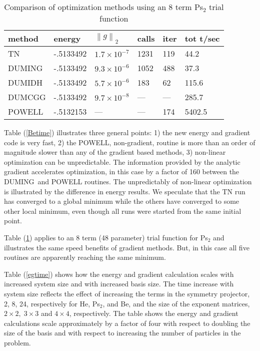\documentclass[12pt,thmsa]{article}
\begin{document}
\begin{table}[p] \centering%
\begin{tabular}{llllll}
\hline\hline
method & energy & $\left\| g\right\| _2$ & calls & iter & tot t/sec \\ \hline
TN & -.5133492 & $1.7\times 10^{-7}$ & 1231 & 119 & 44.2 \\ 
DUMING & -.5133492 & $9.3\times 10^{-6}$ & 1052 & 488 & 37.3 \\ 
DUMIDH & -.5133492 & $5.7\times 10^{-6}$ & 183 & 62 & 115.6 \\ 
DUMCGG & -.5133492 & $9.7\times 10^{-8}$ & --- & --- & 285.7 \\ 
POWELL & -.5132153 & --- & --- & 174 & 5402.5 \\ \hline\hline
\end{tabular}
\caption{Comparison of optimization methods using an 8 term Ps$_{2}$ trial
function\label{Pstime}}%
\end{table}%

Table (\ref{Betime}) illustrates three general points: 1) the new energy and
gradient code is very fast, 2) the POWELL, non-gradient, routine is more
than an order of magnitude slower than any of the gradient based methods, 3)
non-linear optimization can be unpredictable. The information provided by
the analytic gradient accelerates optimization, in this case by a factor of
160 between the DUMING\ and POWELL routines. The unpredictably of non-linear
optimization is illustrated by the difference in energy results. We
speculate that the TN run has converged to a global minimum while the others
have converged to some other local minimum, even though all runs were
started from the same initial point.

Table (\ref{Pstime}) applies to an 8 term (48 parameter) trial function for
Ps$_2$ and illustrates the same speed benefits of gradient methods. But, in
this case all five routines are apparently reaching the same minimum.

Table (\ref{egtime}) shows how the energy and gradient calculation scales
with increased system size and with increased basis size. The time increase
with system size reflects the effect of increasing the terms in the symmetry
projector, 2, 8, 24, respectively for He, Ps$_2$, and Be, and the size of
the exponent matrices, $2\times 2,\;3\times 3$ and $4\times 4$,
respectively. The table shows the energy and gradient calculations scale
approximately by a factor of four with respect to doubling the size of the
basis and with respect to increasing the number of particles in the problem.
\end{document}
